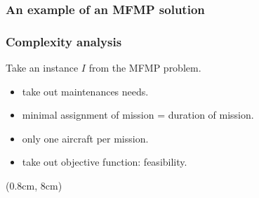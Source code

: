 \begin{frame}[t]
\frametitle{\textbf{An example of an MFMP solution}}
  
\end{frame}


\begin{frame}
\frametitle{\textbf{Complexity analysis}}
  
  Take an instance $I$ from the MFMP problem.
  \pause
  \begin{itemize}[<+->]
    \item take out maintenances needs.
    \item minimal assignment of mission = duration of mission.
    \item only one aircraft per mission.
    \item take out objective function: feasibility.
  \end{itemize}
  
  \begin{block}{}
  \end{block}
  \begin{textblock*}{1.1\textwidth}(0.8cm, 8cm)
    \begin{flushleft}
    \end{flushleft}
  \end{textblock*}
\end{frame}



